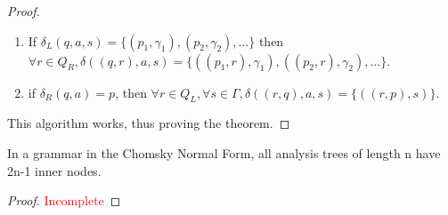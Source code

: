 \documentclass[docid=TP10]{tcom_TP}
\begin{document}
{\begin{proof}
\begin{enumerate}
	\item If $\delta_L(q,a,s)=\{(p_1,\gamma_1),(p_2,\gamma_2),...\}$ then $\forall r \in Q_R, \delta((q,r),a,s)=\{((p_1,r),\gamma_1),((p_2,r),\gamma_2),...\}$.
	\item if $\delta_R(q,a)=p$, then $\forall r \in Q_L, \forall s \in \Gamma, \delta((r,q),a,s)=\{((r,p),s)\}$.
\end{enumerate}
This algorithm works, thus proving the theorem.
\end{proof}
\begin{theorem}
In a grammar in the Chomsky Normal Form, all analysis trees of length n have 2n-1 inner nodes.
\end{theorem}
\begin{proof}
\textcolor{red}{Incomplete}
\end{proof}
}
\end{document}
